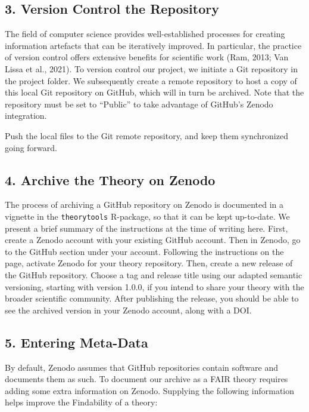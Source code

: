\documentclass[
  man,floatsintext]{apa6}
\begin{document}
\subsection{3. Version Control the Repository}\label{version-control-the-repository}

The field of computer science provides well-established processes for creating information artefacts that can be iteratively improved.
In particular, the practice of version control offers extensive benefits for scientific work (Ram, 2013; Van Lissa et al., 2021).
To version control our project, we initiate a Git repository in the project folder.
We subsequently create a remote repository to host a copy of this local Git repository on GitHub, which will in turn be archived.
Note that the repository
must be set to ``Public'' to take advantage of GitHub's Zenodo integration.

Push the local files to the Git remote repository, and keep them synchronized going forward.

\subsection{4. Archive the Theory on Zenodo}\label{archive-the-theory-on-zenodo}

The process of archiving a GitHub repository on Zenodo is documented in a vignette in the \texttt{theorytools} R-package, so that it can be kept up-to-date.
We present a brief summary of the instructions at the time of writing here.
First, create a Zenodo account with your existing GitHub account.
Then in Zenodo, go to the GitHub section under your account.
Following the instructions on the page, activate Zenodo for your theory repository.
Then, create a new release of the GitHub repository.
Choose a tag and release title using our adapted semantic versioning, starting with version 1.0.0, if you intend to share your theory with the broader scientific community.
After publishing the release,
you should be able to see the archived version in your Zenodo account,
along with a DOI.

\subsection{5. Entering Meta-Data}\label{entering-meta-data}

By default, Zenodo assumes that GitHub repositories contain software and documents them as such.
To document our archive as a FAIR theory requires adding some extra information on Zenodo.
Supplying the following information helps improve the Findability of a theory:
\end{document}
